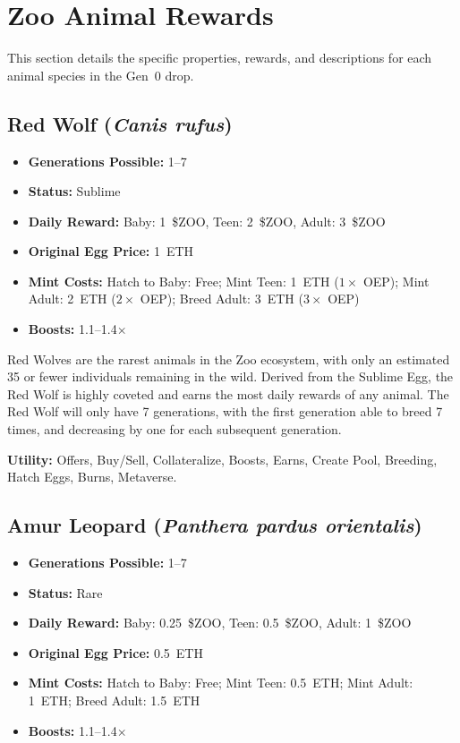 \section{Zoo Animal Rewards}

This section details the specific properties, rewards, and descriptions for each animal species in the Gen~0 drop.

\subsection{Red Wolf (\textit{Canis rufus})}

\begin{itemize}[nosep]
\item \textbf{Generations Possible:} 1--7
\item \textbf{Status:} Sublime
\item \textbf{Daily Reward:} Baby: 1~\$ZOO, Teen: 2~\$ZOO, Adult: 3~\$ZOO
\item \textbf{Original Egg Price:} 1~ETH
\item \textbf{Mint Costs:} Hatch to Baby: Free; Mint Teen: 1~ETH ($1\times$ OEP); Mint Adult: 2~ETH ($2\times$ OEP); Breed Adult: 3~ETH ($3\times$ OEP)
\item \textbf{Boosts:} 1.1--1.4$\times$
\end{itemize}

Red Wolves are the rarest animals in the Zoo ecosystem, with only an estimated 35 or fewer individuals remaining in the wild. Derived from the Sublime Egg, the Red Wolf is highly coveted and earns the most daily rewards of any animal. The Red Wolf will only have 7 generations, with the first generation able to breed 7 times, and decreasing by one for each subsequent generation.

\textbf{Utility:} Offers, Buy/Sell, Collateralize, Boosts, Earns, Create Pool, Breeding, Hatch Eggs, Burns, Metaverse.

\subsection{Amur Leopard (\textit{Panthera pardus orientalis})}

\begin{itemize}[nosep]
\item \textbf{Generations Possible:} 1--7
\item \textbf{Status:} Rare
\item \textbf{Daily Reward:} Baby: 0.25~\$ZOO, Teen: 0.5~\$ZOO, Adult: 1~\$ZOO
\item \textbf{Original Egg Price:} 0.5~ETH
\item \textbf{Mint Costs:} Hatch to Baby: Free; Mint Teen: 0.5~ETH; Mint Adult: 1~ETH; Breed Adult: 1.5~ETH
\item \textbf{Boosts:} 1.1--1.4$\times$
\end{itemize}

